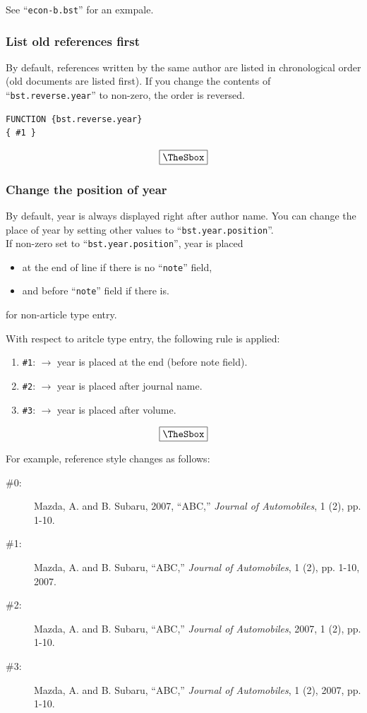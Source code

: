 \documentclass[10pt]{article}
\newenvironment{Frame}%
{\setlength{\fboxsep}{15pt}
\setlength{\mylength}{\linewidth}%
\addtolength{\mylength}{-2\fboxsep}%
\addtolength{\mylength}{-2\fboxrule}%
\Sbox
\minipage{\mylength}%
\setlength{\abovedisplayskip}{0pt}%
\setlength{\belowdisplayskip}{0pt}%
}%
{\endminipage\endSbox
\[\fbox{\TheSbox}\]}
\begin{document}
See ``\texttt{econ-b.bst}'' for an exmpale.


\subsubsection{List old references first}

By default, references written by the same author are listed in
chronological order (old documents are listed first).  If you change the
contents of ``\texttt{bst.reverse.year}'' to non-zero, the order is
reversed.
\begin{Frame}
\begin{verbatim}
FUNCTION {bst.reverse.year}
{ #1 }
\end{verbatim}
\end{Frame}

\subsubsection{Change the position of year}

By default, year is always displayed right after author name.  You can
change the place of year by setting other values to
``\texttt{bst.year.position}''.
\\

If non-zero set to ``\texttt{bst.year.position}'', year is placed
\begin{itemize}
 \item at the end of line if there is no ``\texttt{note}'' field, 
 \item and before ``\texttt{note}'' field if there is.
\end{itemize}
for non-article type entry.

With respect to aritcle type entry, the following rule is applied:
\begin{Frame}
\begin{enumerate}
 \item \verb|#1|: $\rightarrow$ year is placed at the end (before note field).
 \item \verb|#2|: $\rightarrow$ year is placed after journal name.
 \item \verb|#3|: $\rightarrow$ year is placed after volume.
\end{enumerate}
\end{Frame}

For example, reference style changes as follows:
\begin{description}
 \item[\#0: ] Mazda, A. and B. Subaru, 2007, ``ABC,'' \textit{Journal of
            Automobiles}, 1 (2), pp. 1-10.
 \item[\#1: ] Mazda, A. and B. Subaru, ``ABC,'' \textit{Journal of Automobiles},
            1 (2), pp. 1-10, 2007.
 \item[\#2: ] Mazda, A. and B. Subaru, ``ABC,'' \textit{Journal of Automobiles},
            2007, 1 (2), pp. 1-10.
 \item[\#3: ] Mazda, A. and B. Subaru, ``ABC,'' \textit{Journal of Automobiles},
            1 (2), 2007, pp. 1-10.
\end{description}
\end{document}
